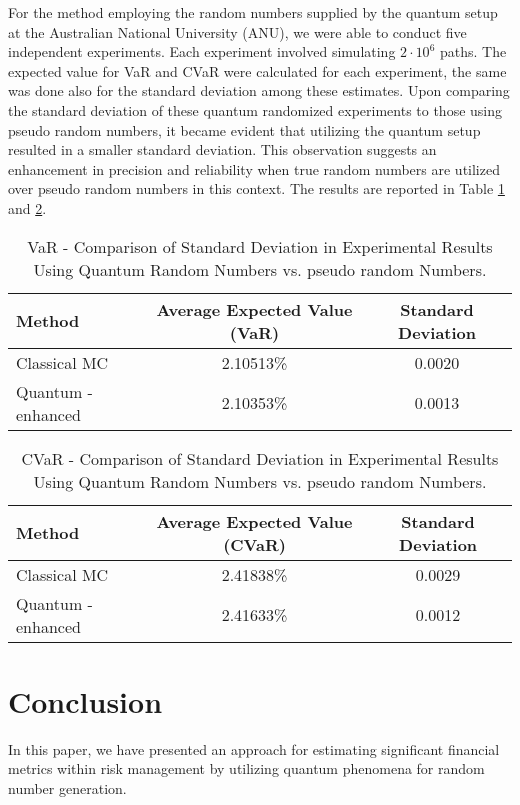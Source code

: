 \documentclass{article}
\begin{document}
For the method employing the random numbers supplied by the quantum setup at the Australian National University (ANU), we were able to conduct five independent experiments. Each experiment involved simulating $2 \cdot 10^6$ paths. The expected value for VaR and CVaR were calculated for each experiment, the same was done also for the standard deviation among these estimates. Upon comparing the standard deviation of these quantum randomized experiments to those using pseudo random numbers, it became evident that utilizing the quantum setup resulted in a smaller standard deviation. This observation suggests an enhancement in precision and reliability when true random numbers are utilized over pseudo random numbers in this context. 
The results are reported in Table \ref{tab:precision_comparison_VaR} and \ref{tab:precision_comparison_CVaR}.
\begin{table}[h]
  \centering
  \begin{tabular}{|l|c|c|}
    \hline
    Method & Average Expected Value (VaR) & Standard Deviation \\ \hline
    Classical MC & 2.10513\% & 0.0020 \\ \hline
    Quantum - enhanced & 2.10353\% & 0.0013 \\ \hline
  \end{tabular}
  \caption{VaR - Comparison of Standard Deviation in Experimental Results Using Quantum Random Numbers vs. pseudo random Numbers.}
  \label{tab:precision_comparison_VaR}
\end{table}

\begin{table}[h]
  \centering
  \begin{tabular}{|l|c|c|}
    \hline
    Method & Average Expected Value (CVaR) & Standard Deviation  \\ \hline
    Classical MC & 2.41838\% & 0.0029 \\ \hline
    Quantum - enhanced & 2.41633\% & 0.0012 \\ \hline
  \end{tabular}
  \caption{CVaR - Comparison of Standard Deviation in Experimental Results Using Quantum Random Numbers vs. pseudo random Numbers.}
  \label{tab:precision_comparison_CVaR}
\end{table}

\section{Conclusion}
In this paper, we have presented an approach for estimating significant financial metrics within risk management by utilizing quantum phenomena for random number generation. 
\end{document}
